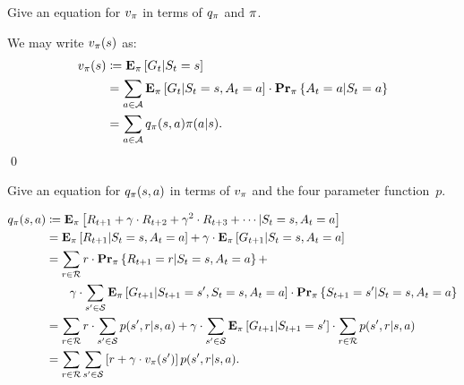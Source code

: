 \begin{exer}
Give an equation for $v_{\pi}$ in terms of $q_{\pi}$ and $\pi$.
\end{exer}
\begin{solution}
We may write $v_{\pi}(s)$ as:
\begin{align*}
    v_{\pi}(s) & \coloneqq \mathbf{E}_{\pi} \left [ G_t \vert S_t = s \right ] \\
                   & = \sum_{a \in \mathcal{A}} \mathbf{E}_{\pi} \left [ G_t \vert S_t = s, A_t = a \right ] 
                        \cdot \mathbf{Pr}_{\pi} \left \{ A_t = a \vert S_t = a \right \} \\
                   & = \sum_{a \in \mathcal{A}} q_{\pi}(s, a) \pi (a \vert s).
\end{align*}
\qed
\end{solution}

\begin{exer}
Give an equation for $q_{\pi} (s, a)$ in terms of $v_{\pi}$ and the 
four parameter function~$p$. 
\end{exer}
\begin{solution}
\begin{align*}
    q_{\pi}(s, a) & \coloneqq \mathbf{E}_{\pi} \left [ R_{t + 1} + \gamma \cdot R_{t + 2} + \gamma^2 \cdot R_{t + 3} + \cdots \vert S_t = s, A_t = a \right ] \\
                  & = \mathbf{E}_{\pi} \left [ R_{t + 1} \vert S_t = s, A_t = a \right ] + 
                    \gamma \cdot \mathbf{E}_{\pi} \left [ G_{t + 1} \vert S_t = s, A_t = a \right ] \\
                  & = \sum_{r \in \mathcal{R}} r \cdot \mathbf{Pr}_{\pi} \left \{ R_{t + 1} = r \vert S_t = s, A_t = a \right \} + \\
                  & \quad \quad \gamma \cdot \sum_{s' \in \mathcal{S}} \mathbf{E}_{\pi} \left [ G_{t + 1} \vert S_{t + 1} = s', S_t = s, A_t = a \right ]
                        \cdot \mathbf{Pr}_{\pi} \left \{ S_{t + 1} = s' \vert S_t = s, A_t = a \right \} \\ 
                  & = \sum_{r \in \mathcal{R}} r \cdot \sum_{s' \in \mathcal{S}} p(s', r \vert s, a) + 
                    \gamma \cdot \sum_{s' \in \mathcal{S}} \mathbf{E}_{\pi} \left [ G_{t + 1} \vert S_{t + 1} = s' \right ] 
                        \cdot \sum_{r \in \mathcal{R}} p(s', r \vert s, a) \\
                  & = \sum_{r \in \mathcal{R}} \sum_{s' \in \mathcal{S}} \left [ r + \gamma \cdot v_{\pi}(s') \right ] p(s', r \vert s, a).
\end{align*}
\end{solution}


